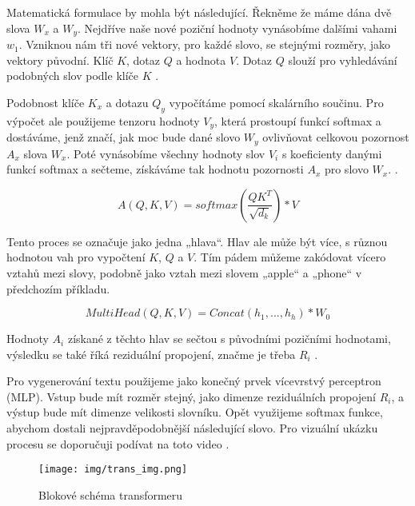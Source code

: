 \documentclass[FM,DP]{tulthesis}
\begin{document}
		Matematická formulace by mohla být následující. Řekněme že máme dána dvě slova $W_x$ a $W_y$. Nejdříve naše nové poziční hodnoty vynásobíme dalšími vahami $w_1$. Vzniknou nám tři nové vektory, pro každé slovo, se stejnými rozměry, jako vektory původní. Klíč $K$, dotaz $Q$ a hodnota $V$. Dotaz $Q$ slouží pro vyhledávání podobných slov podle klíče $K$ \cite{vaswani2023attention} \cite{rothman2021transformers}. 
		
		Podobnost klíče $K_x$ a dotazu $Q_y$ vypočítáme pomocí skalárního součinu. Pro výpočet ale použijeme tenzoru hodnoty $V_y$, která prostoupí funkcí softmax a dostáváme, jenž značí, jak moc bude dané slovo $W_y$ ovlivňovat celkovou pozornost $A_x$ slova $W_x$. Poté vynásobíme všechny hodnoty slov $V_i$ s koeficienty danými funkcí softmax a sečteme, získáváme tak hodnotu pozornosti $A_x$ pro slovo $W_x$. \cite{vaswani2023attention} \cite{rothman2021transformers}.
		
		\begin{equation}
			A(Q, K, V) = softmax(\frac{QK^T}{\sqrt{d_k}})*V
		\end{equation}
		
		Tento proces se označuje jako jedna „hlava“. Hlav ale může být více, s různou hodnotou vah pro vypočtení $K$, $Q$ a $V$. Tím pádem můžeme zakódovat vícero vztahů mezi slovy, podobně jako vztah mezi slovem „apple“ a „phone“ v předchozím příkladu. 
		
		\begin{equation}
			MultiHead(Q, K, V) = Concat(h_1,...,h_h)*W_0
		\end{equation}
		
		Hodnoty $A_i$ získané z těchto hlav se sečtou s původními pozičními hodnotami, výsledku se také říká reziduální propojení, značme je třeba $R_i$ \cite{vaswani2023attention} \cite{rothman2021transformers}.
		
		Pro vygenerování textu použijeme jako konečný prvek vícevrstvý perceptron (MLP). Vstup bude mít rozměr stejný, jako dimenze reziduálních propojení $R_i$, a výstup bude mít dimenze velikosti slovníku. Opět využijeme softmax funkce, abychom dostali nejpravděpodobnější následující slovo. Pro vizuální ukázku procesu se doporučuji podívat na toto video \cite{ytb:transformers} \cite{vaswani2023attention} \cite{rothman2021transformers}.
		
		\begin{figure}[H]
			\centering
			\texttt{[image: img/trans\_img.png]}
			\caption{Blokové schéma transformeru \cite{trans_img}}
			\label{fig:trans}
		\end{figure}
		
\end{document}
